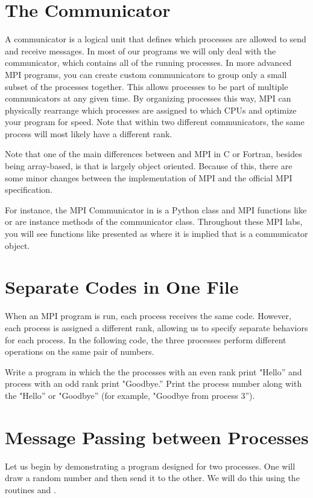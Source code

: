 \section*{The Communicator}
A communicator is a logical unit that defines which processes are allowed to send and receive messages. 
In most of our programs we will only deal with the  communicator, which contains all of the running processes. 
In more advanced MPI programs, you can create custom communicators to group only a small subset of the processes together.
This allows processes to be part of multiple communicators at any given time.
By organizing processes this way, MPI can physically rearrange which processes are assigned to which CPUs and optimize your program for speed. 
Note that within two different communicators, the same process will most likely have a different rank.

Note that one of the main differences between  and MPI in C or Fortran, besides being array-based, is that  is largely object oriented. 
Because of this, there are some minor changes between the  implementation of MPI and the official MPI specification.

For instance, the MPI Communicator in  is a Python class and MPI functions like  or  are instance methods of the communicator class. 
Throughout these MPI labs, you will see functions like  presented as  where it is implied that  is a communicator object.

\section*{Separate Codes in One File}
When an MPI program is run, each process receives the same code. 
However, each process is assigned a different rank, allowing us to specify separate behaviors for each process. 
In the following code, the three processes perform different operations on the same pair of numbers.


\begin{problem}
Write a program in which the the processes with an even rank print "Hello'' and process with an odd rank print "Goodbye.'' 
Print the process number along with the "Hello'' or "Goodbye'' 
(for example, "Goodbye from process 3'').
\end{problem}

\section*{Message Passing between Processes}
Let us begin by demonstrating a program designed for two processes. 
One will draw a random number and then send it to the other. 
We will do this using the routines  and .


